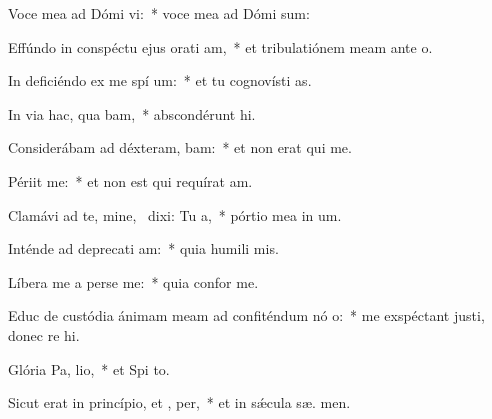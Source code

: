 \item Voce mea ad Dómi vi:~* voce mea ad Dómi  sum:
\item Effúndo in conspéctu ejus orati am,~* et tribulatiónem meam ante  o.
\item In deficiéndo ex me spí um:~* et tu cognovísti  as.
\item In via hac, qua bam,~* abscondérunt  hi.
\item Considerábam ad déxteram,  bam:~* et non erat qui  me.
\item Périit   me:~* et non est qui requírat  am.
\item Clamávi ad te, mine,~\pscross{} dixi: Tu   a,~* pórtio mea in  um.
\item Inténde ad deprecati am:~* quia humili  mis.
\item Líbera me a perse me:~* quia confor   me.
\item Educ de custódia ánimam meam ad confiténdum nó o:~* me exspéctant justi, donec re hi.
\item Glória Pa,  lio,~* et Spi to.
\item Sicut erat in princípio, et ,  per,~* et in sǽcula sæ. men.
